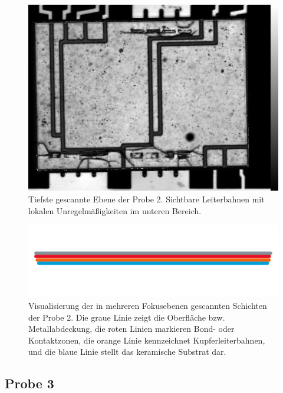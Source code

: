 \begin{figure}[htbp]
    \centering
    \includegraphics[scale=0.30]{Bilder/Probe2_i794_x005.jpg}
    \caption{Tiefste gescannte Ebene der Probe 2. Sichtbare Leiterbahnen mit lokalen Unregelmäßigkeiten im unteren Bereich.}
    \label{Abbildung 10:probe2_5}
\end{figure}
\begin{figure}[htbp]
    \centering
    \includegraphics[scale=0.75]{Bilder/probelinie2}
    \caption{Visualisierung der in mehreren Fokusebenen gescannten Schichten der Probe 2. Die graue Linie zeigt die Oberfläche bzw. Metallabdeckung, die roten Linien markieren Bond- oder Kontaktzonen, die orange Linie kennzeichnet Kupferleiterbahnen, und die blaue Linie stellt das keramische Substrat dar.}
    \label{Abbildung 11 :Visualisierung der in mehreren Fokusebenen gescannten Schichten der Probe 2. Die graue Linie zeigt die Oberfläche bzw. Metallabdeckung, die roten Linien markieren Bond- oder Kontaktzonen, die orange Linie kennzeichnet Kupferleiterbahnen, und die blaue Linie stellt das keramische Substrat dar.}
\end{figure}

\subsection{Probe 3}

